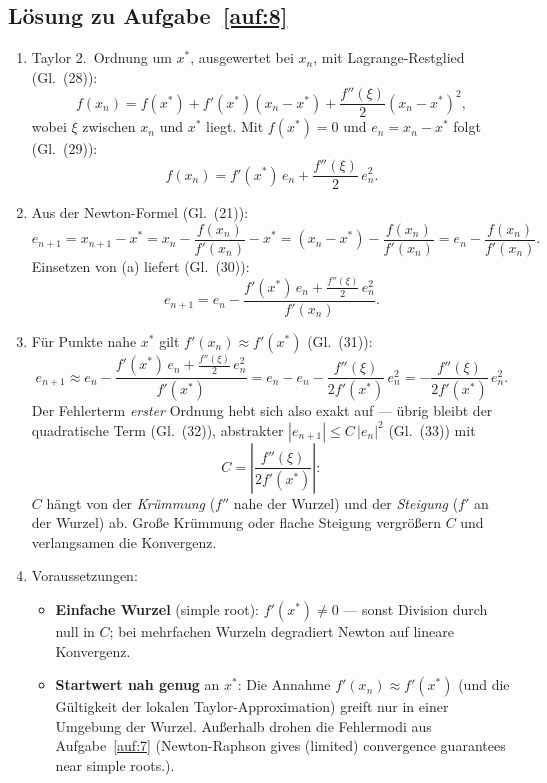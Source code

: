 \documentclass[a4paper,11pt]{scrartcl}
\begin{document}
\subsection*{Lösung zu Aufgabe~\ref{auf:8}}

\begin{enumerate}[label=(\alph*)]
  \item Taylor 2.~Ordnung um $x^*$, ausgewertet bei $x_n$, mit Lagrange-Restglied
  (Gl.~(28)):
  \[ f(x_n) = f(x^*) + f'(x^*)(x_n - x^*) + \frac{f''(\xi)}{2}(x_n - x^*)^2, \]
  wobei $\xi$ zwischen $x_n$ und $x^*$ liegt. Mit $f(x^*) = 0$ und $e_n = x_n - x^*$
  folgt (Gl.~(29)):
  \[ f(x_n) = f'(x^*)\, e_n + \frac{f''(\xi)}{2}\, e_n^2. \]
  \item Aus der Newton-Formel (Gl.~(21)):
  \[ e_{n+1} = x_{n+1} - x^* = x_n - \frac{f(x_n)}{f'(x_n)} - x^*
     = (x_n - x^*) - \frac{f(x_n)}{f'(x_n)} = e_n - \frac{f(x_n)}{f'(x_n)}. \]
  Einsetzen von (a) liefert (Gl.~(30)):
  \[ e_{n+1} = e_n - \frac{f'(x^*)\, e_n + \frac{f''(\xi)}{2}\, e_n^2}{f'(x_n)}. \]
  \item Für Punkte nahe $x^*$ gilt $f'(x_n) \approx f'(x^*)$ (Gl.~(31)):
  \[ e_{n+1} \approx e_n - \frac{f'(x^*)\, e_n + \frac{f''(\xi)}{2}\, e_n^2}{f'(x^*)}
     = e_n - e_n - \frac{f''(\xi)}{2 f'(x^*)}\, e_n^2
     = -\frac{f''(\xi)}{2 f'(x^*)}\, e_n^2. \]
  Der Fehlerterm \emph{erster} Ordnung hebt sich also exakt auf --- übrig bleibt der
  quadratische Term (Gl.~(32)), abstrakter $|e_{n+1}| \leq C\,|e_n|^2$ (Gl.~(33)) mit
  \[ C = \left|\frac{f''(\xi)}{2 f'(x^*)}\right|: \]
  $C$ hängt von der \emph{Krümmung} ($f''$ nahe der Wurzel) und der \emph{Steigung}
  ($f'$ an der Wurzel) ab. Große Krümmung oder flache Steigung vergrößern $C$ und
  verlangsamen die Konvergenz.
  \item Voraussetzungen:
  \begin{itemize}[nosep]
    \item \textbf{Einfache Wurzel} (simple root): $f'(x^*) \neq 0$ --- sonst Division
    durch null in $C$; bei mehrfachen Wurzeln degradiert Newton auf lineare Konvergenz.
    \item \textbf{Startwert nah genug} an $x^*$: Die Annahme $f'(x_n) \approx f'(x^*)$
    (und die Gültigkeit der lokalen Taylor-Approximation) greift nur in einer Umgebung
    der Wurzel. Außerhalb drohen die Fehlermodi aus Aufgabe~\ref{auf:7}
    (\glqq Newton-Raphson gives (limited) convergence guarantees near simple
    roots.\grqq).
  \end{itemize}
\end{enumerate}
\end{document}
